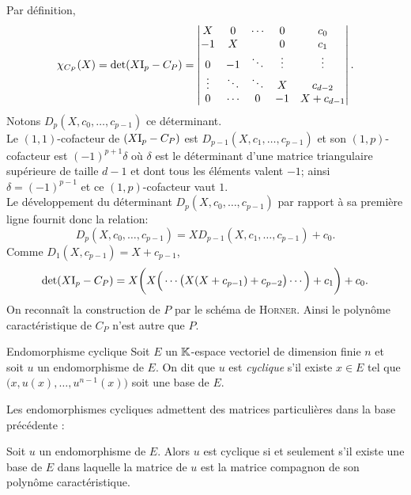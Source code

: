 \begin{preuve}
    Par définition,
    $$
    \chi_{C_P}(X) = \det(X \mathrm{I}_p - C_P) = 
    \begin{vmatrix}
        X & 0 & \cdots & 0 & c_0 \\
        -1 & X & & 0 & c_1 \\
        0 & -1 & \ddots & \vdots & \vdots \\
        \vdots & \ddots & \ddots & X & c_{d-2} \\
        0 & \cdots & 0 & -1 & X + c_{d-1}
    \end{vmatrix}.
    $$
    Notons $D_p(X, c_0, \dots, c_{p-1})$ ce déterminant. \\
    Le $(1,1)$-cofacteur de $(X \mathrm{I}_p - C_P)$ est $D_{p-1}(X, c_1, \dots, c_{p-1})$ et son $(1,p)$-cofacteur est $(-1)^{p+1} \delta$ où $\delta$ est le déterminant d'une matrice triangulaire supérieure de taille $d-1$ et dont tous les éléments valent $-1$; ainsi $\delta = (-1)^{p-1}$ et ce $(1,p)$-cofacteur vaut $1$. \\
    Le développement du déterminant $D_p(X, c_0, \dots, c_{p-1})$ par rapport à sa première ligne fournit donc la relation:
    $$D_p(X, c_0, \dots, c_{p-1}) = X D_{p-1}(X, c_1, \dots, c_{p-1}) + c_0.$$
    Comme $D_1(X, c_{p-1}) = X + c_{p-1}$,
    $$\det(X \mathrm{I}_p - C_P) = X \bigg(X \Big(\cdots \big(X(X+c_{p-1}) + c_{p-2} \big) \cdots \Big) + c_1 \bigg) + c_0.$$
    On reconnaît la construction de $P$ par le schéma de \textsc{Horner}. Ainsi le polynôme caractéristique de $C_P$ n'est autre que $P$. 
\end{preuve} 

\begin{defi}{Endomorphisme cyclique}
    Soit $E$ un $\mathbb{K}$-espace vectoriel de dimension finie $n$ et soit $u$ un endomorphisme de $E$. On dit que $u$ est \emph{cyclique} s'il existe $x \in E$ tel que $\big(x, u(x), \dots, u^{n-1}(x) \big)$ soit une base de $E$. 
\end{defi}

Les endomorphismes cycliques admettent des matrices particulières dans la base précédente :

\begin{prop}{}
    Soit $u$ un endomorphisme de $E$. Alors $u$ est cyclique si et seulement s'il existe une base de $E$ dans laquelle la matrice de $u$ est la matrice compagnon de son polynôme caractéristique.
\end{prop}

